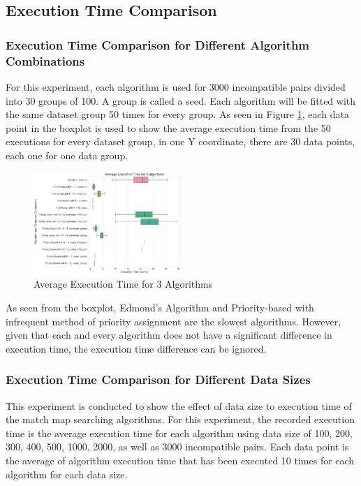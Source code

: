 \documentclass[conference]{IEEEtran}
\begin{document}
\subsection{Execution Time Comparison}
\subsubsection{Execution Time Comparison for Different Algorithm Combinations}
For this experiment, each algorithm is used for 3000 incompatible pairs divided into 30 groups of 100. A group is called a seed. Each
algorithm will be fitted with the same dataset group 50 times for every group. As seen in Figure \ref{exctimealgo}, each data point in the boxplot
is used to show the average execution time from the 50 executions for every dataset group, in one Y coordinate, there are 30 data
points, each one for one data group. 

\begin{figure}[h]
    \includegraphics[width=0.5\textwidth]{images/average_execution_time_for_3_algorithms.png}
    \caption{Average Execution Time for 3 Algorithms}
    \label{exctimealgo}
\end{figure}

As seen from the boxplot, Edmond's Algorithm and Priority-based with infrequent method of priority assignment are the slowest
algorithms. However, given that each and every algorithm does not have a significant difference in execution time, the execution
time difference can be ignored.

\subsubsection{Execution Time Comparison for Different Data Sizes}
This experiment is conducted to show the effect of data size to execution time of the match map searching algorithms. For this
experiment, the recorded execution time is the average execution time for each algorithm using data size of  100, 200, 300, 400,
500, 1000, 2000, as well as 3000 incompatible pairs. Each data point is the average of algorithm execution time that has been
executed 10 times for each algorithm for each data size.
\end{document}
